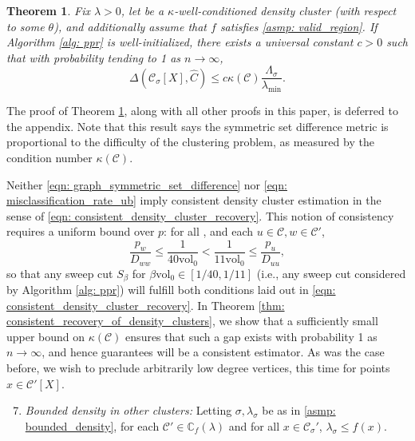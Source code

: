 \documentclass[11pt,twoside]{article}
\newtheorem{theorem}{Theorem}
\newcommand{\vol}{\mathrm{vol}}
\newcommand{\1}{\mathbf{1}}
\newcommand{\pbf}{p}        %
\newcommand{\Xbf}{X}             %
\newcommand{\Dbf}{D}
\newcommand{\Cbb}{\mathbb{C}}
\newcommand{\Cset}{\mathcal{C}}
\newcommand{\Csig}{\Cset_{\sigma}}
\newcommand{\Cest}{\widehat{C}}
\begin{document}
\begin{theorem}
  \label{thm: misclassification_rate}
  Fix $\lambda > 0$, let \smash{$\Cset \in \Cbb_f(\lambda)$} be a
  $\kappa$-well-conditioned density cluster (with respect to some $\theta$), and
  additionally assume that $f$ satisfies \ref{asmp: valid_region}. If Algorithm
  \ref{alg: ppr} is well-initialized, there exists a universal constant $c >
  0$ such that with probability tending to 1 as $n \to \infty$,  
  \begin{equation}
    \label{eqn: misclassification_rate_ub}
    \Delta(\Csig[\Xbf], \Cest) \leq c \kappa(\Cset)
    \frac{\Lambda_{\sigma}}{\lambda_{\min}}. 
  \end{equation}
\end{theorem}

The proof of Theorem \ref{thm: misclassification_rate}, along with all other
proofs in this paper, is deferred to the appendix. Note that this 
result says the symmetric set difference metric \smash{$\Delta(\Csig[\Xbf],
  \Cest)$} is proportional to the difficulty of the clustering problem, as
measured by the condition number $\kappa(\Cset)$. 

Neither \eqref{eqn: graph_symmetric_set_difference} nor \eqref{eqn:
  misclassification_rate_ub} imply consistent density cluster estimation in the 
sense of \eqref{eqn: consistent_density_cluster_recovery}. This notion of
consistency requires a uniform bound over $\pbf$: for all \smash{$\Cset'
  \in \Cbb_f(\lambda), \Cset' \neq \Cset$}, and each $u \in \Cset, w \in
\Cset'$,  
\begin{equation}
\label{eqn: ppr_gap}
\frac{p_{w}}{\Dbf_{ww}} \leq \frac{1}{40\vol_0} < \frac{1}{11\vol_0} \leq
\frac{p_u}{\Dbf_{uu}}, 
\end{equation}
so that any sweep cut $S_{\beta}$ for $\beta \vol_0 \in [1/40,1/11]$ (i.e., any
sweep cut considered by Algorithm \ref{alg: ppr}) will fulfill both conditions
laid out in \eqref{eqn: consistent_density_cluster_recovery}. In Theorem
\ref{thm: consistent_recovery_of_density_clusters}, we show that a sufficiently
small upper bound on $\kappa(\Cset)$ ensures that such a gap exists with probability
1 as $n \to \infty$, and hence guarantees \smash{$\Cest$} will be a consistent  
estimator. As was the case before, we wish to preclude arbitrarily low degree
vertices, this time for points $x \in \Cset'[\Xbf]$. 
\begin{enumerate}[label=(A\arabic*)]
  \setcounter{enumi}{6}
\item 
  \label{asmp: C'_bounded_density}
  \emph{Bounded density in other clusters:} Letting $\sigma,\lambda_{\sigma}$ be 
  as in \ref{asmp: bounded_density}, for each $\Cset' \in \Cbb_f(\lambda)$ and
  for all $x \in \Csig'$, $\lambda_{\sigma} \leq f(x)$. 
\end{enumerate}
\end{document}
